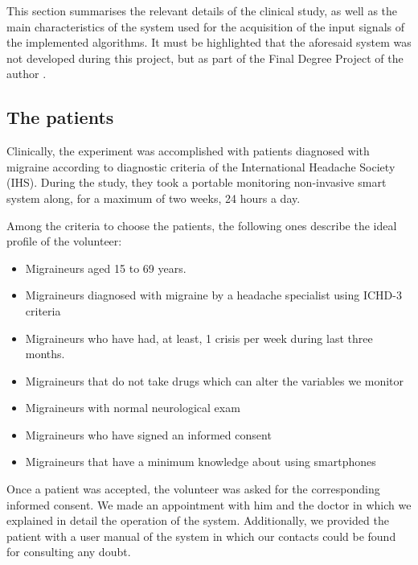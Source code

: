 \label{sec:experiment}

This section summarises the relevant details of the clinical study, as well as the main characteristics of the system used for the acquisition of the input signals of the implemented algorithms. It must be highlighted that the aforesaid system was not developed during this project, but as part of the Final Degree Project of the author \cite{Irene:PFC:2014}.


\subsection{The patients}
\label{subsec:thepatients}

Clinically, the experiment was accomplished with patients diagnosed with migraine according to diagnostic criteria of the International Headache Society (IHS). During the study, they took a portable monitoring non-invasive smart system along, for a maximum of two weeks, 24 hours a day. 

Among the criteria to choose the patients, the following ones describe the ideal profile of the volunteer:
\begin{itemize}
	\item Migraineurs aged 15 to 69 years.
	\item Migraineurs diagnosed with migraine by a headache specialist using ICHD-3 criteria \cite{pmid23771276}
	\item Migraineurs who have had, at least, 1 crisis per week during last three months.
	\item Migraineurs that do not take drugs which can alter the variables we monitor
	\item Migraineurs with normal neurological exam
	\item Migraineurs who have signed an informed consent
	\item Migraineurs that have a minimum knowledge about using smartphones
\end{itemize}

Once a patient was accepted, the volunteer was asked for the corresponding informed consent. We made an appointment with him and the doctor in which we explained in detail the operation of the system. Additionally, we provided the patient with a user manual of the system in which our contacts could be found for consulting any doubt.


